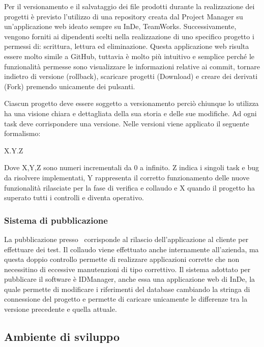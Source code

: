 Per il versionamento e il salvataggio dei file prodotti durante la realizzazione dei progetti è previsto l'utilizzo di una repository creata dal Project Manager su un'applicazione web ideato sempre su InDe, TeamWorks. Successivamente, vengono forniti ai dipendenti scelti nella realizzazione di uno specifico progetto i permessi di: scrittura, lettura ed eliminazione.
Questa applicazione web risulta essere molto simile a GitHub, tuttavia è molto più intuitivo e semplice perché le funzionalità permesse sono visualizzare le informazioni relative ai commit, tornare indietro di versione (rollback), scaricare progetti (Download) e creare dei derivati (Fork) premendo unicamente dei pulsanti.

Ciascun progetto deve essere soggetto a versionamento perciò chiunque lo utilizza ha una visione chiara e dettagliata della sua storia e delle sue modifiche. Ad ogni task deve corrispondere una versione. Nelle versioni viene applicato il seguente formalismo:
\begin{center}
	X.Y.Z
\end{center}
Dove X,Y,Z sono numeri incrementali da 0 a infinito. 
Z indica i singoli task e bug da risolvere implementati, Y rappresenta il corretto funzionamento delle nuove funzionalità rilasciate per la fase di verifica e collaudo e X quando il progetto ha superato tutti i controlli e diventa operativo.  

\subsubsection{Sistema di pubblicazione}
La pubblicazione presso \azienda\ corrisponde al rilascio dell'applicazione al cliente per effettuare dei test. Il collaudo viene effettuato anche internamente all'azienda, ma questa doppio controllo permette di realizzare applicazioni corrette che non necessitino di eccessive manutenzioni di tipo correttivo. 
Il sistema adottato per pubblicare il software è IDManager, anche essa una applicazione web di InDe, la quale permette di modificare i riferimenti del database cambiando la stringa di connessione del progetto e permette di caricare unicamente le differenze tra la versione precedente e quella attuale.


\subsection{Ambiente di sviluppo}
\label{cap1:Ambiente di sviluppo}

